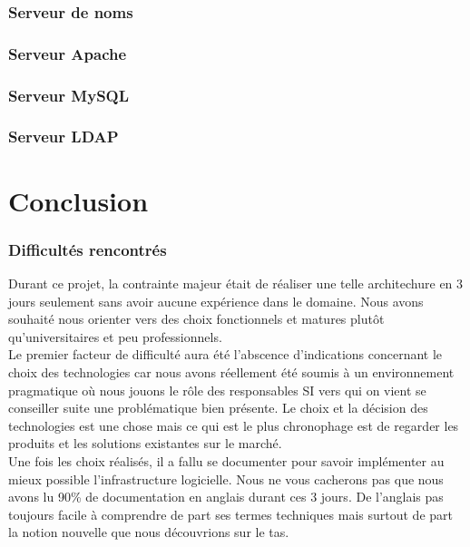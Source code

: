 \documentclass[11pt,a4paper]{report}
\begin{document}
        \section{Serveur de noms}
        \section{Serveur Apache}
        \section{Serveur MySQL}
        \section{Serveur LDAP}
    \part{Conclusion}
        \section{Difficultés rencontrés}
            
            Durant ce projet, la contrainte majeur était de réaliser une telle architechure en 3 jours seulement sans avoir aucune expérience dans le domaine. Nous avons souhaité nous orienter vers des choix fonctionnels et matures plutôt qu'universitaires et peu professionnels.\\
            
            Le premier facteur de difficulté aura été l'abscence d'indications concernant le choix des technologies car nous avons réellement été soumis à un environnement pragmatique où nous jouons le rôle des responsables SI vers qui on vient se conseiller suite une problématique bien présente.
            Le choix et la décision des technologies est une chose mais ce qui est le plus chronophage est de regarder les produits et les solutions existantes sur le marché.\\
            
            Une fois les choix réalisés, il a fallu se documenter pour savoir implémenter au mieux possible l'infrastructure logicielle. Nous ne vous cacherons pas que nous avons lu 90\% de documentation en anglais durant ces 3 jours. De l'anglais pas toujours facile à comprendre de part ses termes techniques mais surtout de part la notion nouvelle que nous découvrions sur le tas.\\
            
\end{document}

